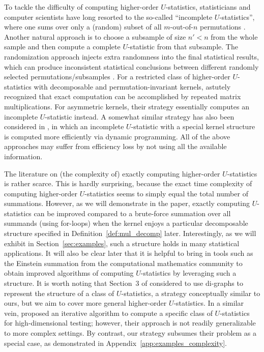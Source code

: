 \documentclass[sn-mathphys, natbib=false]{sn-jnl}
\theoremstyle{plain}
\theoremstyle{definition}
\begin{document}
\begin{bibunit}[agsm]
To tackle the difficulty of computing higher-order $U$-statistics, statisticians and computer scientists have long resorted to the so-called ``incomplete $U$-statistics'', where one sums over only a (random) subset of all $m$-out-of-$n$ permutations \citep{blom1976some, nowicki1988subgraph, shao2025u}. Another natural approach is to choose a subsample of size $n' < n$ from the whole sample and then compute a complete $U$-statistic from that subsample. The randomization approach injects extra randomness into the final statistical results, which can produce inconsistent statistical conclusions between different randomly selected permutations/subsamples \citep{guo2025rank}. For a restricted class of higher-order $U$-statistics with decomposable and permutation-invariant kernels, \citet{kong2018estimating} astutely recognized that exact computation can be accomplished by repeated matrix multiplications. For asymmetric kernels, their strategy essentially computes an incomplete $U$-statistic instead. A somewhat similar strategy has also been considered in \citet{zhang2025adaptive}, in which an incomplete $U$-statistic with a special kernel structure is computed more efficiently via dynamic programming. All of the above approaches may suffer from efficiency loss by not using all the available information.

The literature on (the complexity of) exactly computing higher-order $U$-statistics is rather scarce. This is hardly surprising, because the exact time complexity of computing higher-order $U$-statistics seems to simply equal the total number of summations. However, as we will demonstrate in the paper, exactly computing $U$-statistics can be improved compared to a brute-force summation over all summands (using for-loops) when the kernel enjoys a particular decomposable structure specified in Definition~\ref{def:mul_decomp} later. Interestingly, as we will exhibit in Section~\ref{sec:examples}, such a structure holds in many statistical applications. It will also be clear later that it is helpful to bring in tools such as the Einstein summation from the computational mathematics community to obtain improved algorithms of computing $U$-statistics by leveraging such a structure. It is worth noting that Section~3 of \citet{liu2024hypothesis} considered to use di-graphs to represent the structure of a class of $U$-statistics, a strategy conceptually similar to ours, but we aim to cover more general higher-order $U$-statistics. In a similar vein, \citet{he2021asymptotically} proposed an iterative algorithm to compute a specific class of $U$-statistics for high-dimensional testing; however, their approach is not readily generalizable to more complex settings. By contrast, our strategy subsumes their problem as a special case, as demonstrated in Appendix~\ref{app:examples_complexity}.


\end{bibunit}
\end{document}
